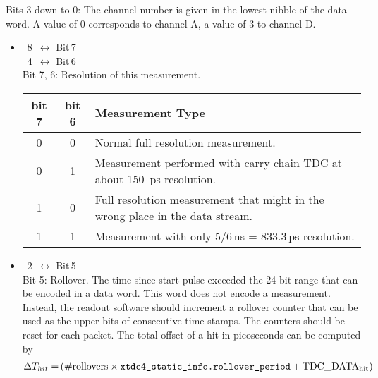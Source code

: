 \begin{description}[style=nextline]
{\begin{itemize}
        \end{itemize}

        Bits 3 down to 0:
        The channel number is given in the lowest nibble of the data word. A
        value of {0} corresponds to channel A, a value of {3}
        to channel D.\\
    }{
        \begin{itemize}
            \item{}~8~$\leftrightarrow$ Bit\,7\\
            ~4~$\leftrightarrow$ Bit\,6\\
            Bit 7, 6: Resolution of this measurement.\par
            \begin{small}
            \begin{tabular}{|c|c||l|}
                \hline
                bit 7 & bit 6 & Measurement Type \\\hline\hline
                0 & 0 &  Normal full resolution measurement.\\\hline
                0 & 1 &  Measurement performed with carry chain TDC at about \SI{150}{\pico\second} resolution.\\\hline
                1 & 0 &  Full resolution measurement that might in the wrong place in the data stream.\\\hline
                1 & 1 &  Measurement with only $5/6$\,ns = $833.\overline{3}$\,ps resolution. \\\hline
            \end{tabular}
            \end{small}
            \item{}~2~$\leftrightarrow$ Bit\,5\\
            Bit 5: Rollover. The time since start pulse exceeded the 24-bit range
            that can be encoded in a data word. This word does not encode a
            measurement.  Instead, the readout software should increment a rollover counter that can be used as the upper bits of consecutive time stamps.
            The counters should be reset for each packet.  The total offset of a
            hit in picoseconds can be computed by
            \begin{align*}
                \Delta T_{hit} = &\,(\text{\#rollovers} \times \texttt{xtdc4\_static\_info.rollover\tu period} + \mathrm{TDC\_DATA_{hit}}) \\

\end{align*}
\end{itemize}}
\end{description}
